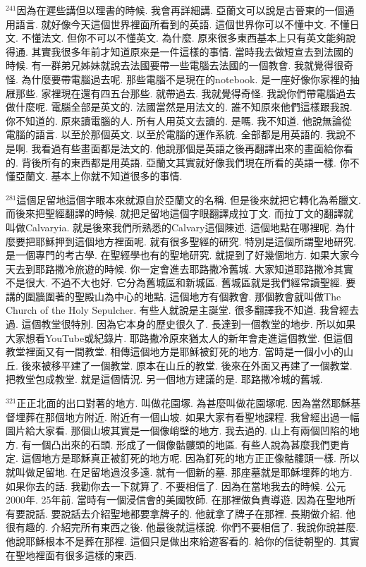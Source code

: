 \documentclass{book}
\begin{document}
$^{241}$因為在遲些講但以理書的時候.
我會再詳細講.
亞蘭文可以說是古晉東的一個通用語言.
就好像今天這個世界裡面所看到的英語.
這個世界你可以不懂中文.
不懂日文.
不懂法文.
但你不可以不懂英文.
為什麼.
原來很多東西基本上只有英文能夠說得通.
其實我很多年前才知道原來是一件這樣的事情.
當時我去做短宣去到法國的時候.
有一群弟兄姊妹就說去法國要帶一些電腦去法國的一個教會.
我就覺得很奇怪.
為什麼要帶電腦過去呢.
那些電腦不是現在的notebook.
是一座好像你家裡的抽屜那些.
家裡現在還有四五台那些.
就帶過去.
我就覺得奇怪.
我說你們帶電腦過去做什麼呢.
電腦全部是英文的.
法國當然是用法文的.
誰不知原來他們這樣跟我說.
你不知道的.
原來讀電腦的人.
所有人用英文去讀的.
是嗎.
我不知道.
他說無論從電腦的語言.
以至於那個英文.
以至於電腦的運作系統.
全部都是用英語的.
我說不是啊.
我看過有些畫面都是法文的.
他說那個是英語之後再翻譯出來的畫面給你看的.
背後所有的東西都是用英語.
亞蘭文其實就好像我們現在所看的英語一樣.
你不懂亞蘭文.
基本上你就不知道很多的事情.

$^{281}$這個足留地這個字眼本來就源自於亞蘭文的名稱.
但是後來就把它轉化為希臘文.
而後來把聖經翻譯的時候.
就把足留地這個字眼翻譯成拉丁文.
而拉丁文的翻譯就叫做Calvaryia.
就是後來我們所熟悉的Calvary這個陳述.
這個地點在哪裡呢.
為什麼要把耶穌押到這個地方裡面呢.
就有很多聖經的研究.
特別是這個所謂聖地研究.
是一個專門的考古學.
在聖經學也有的聖地研究.
就提到了好幾個地方.
如果大家今天去到耶路撒冷旅遊的時候.
你一定會進去耶路撒冷舊城.
大家知道耶路撒冷其實不是很大.
不過不大也好.
它分為舊城區和新城區.
舊城區就是我們經常讀聖經.
要講的圍牆圍著的聖殿山為中心的地點.
這個地方有個教會.
那個教會就叫做The Church of the Holy Sepulcher.
有些人就說是主誕堂.
很多翻譯我不知道.
我曾經去過.
這個教堂很特別.
因為它本身的歷史很久了.
長達到一個教堂的地步.
所以如果大家想看YouTube或紀錄片.
耶路撒冷原來猶太人的新年會走進這個教堂.
但這個教堂裡面又有一間教堂.
相傳這個地方是耶穌被釘死的地方.
當時是一個小小的山丘.
後來被移平建了一個教堂.
原本在山丘的教堂.
後來在外面又再建了一個教堂.
把教堂包成教堂.
就是這個情況.
另一個地方建議的是.
耶路撒冷城的舊城.

$^{321}$正正北面的出口對著的地方.
叫做花園塚.
為甚麼叫做花園塚呢.
因為當然耶穌基督埋葬在那個地方附近.
附近有一個山坡.
如果大家有看聖地課程.
我曾經出過一幅圖片給大家看.
那個山坡其實是一個像峭壁的地方.
我去過的.
山上有兩個凹陷的地方.
有一個凸出來的石頭.
形成了一個像骷髏頭的地區.
有些人說為甚麼我們更肯定.
這個地方是耶穌真正被釘死的地方呢.
因為釘死的地方正正像骷髏頭一樣.
所以就叫做足留地.
在足留地過沒多遠.
就有一個新的墓.
那座墓就是耶穌埋葬的地方.
如果你去的話.
我勸你去一下就算了.
不要相信了.
因為在當地我去的時候.
公元2000年.
25年前.
當時有一個浸信會的美國牧師.
在那裡做負責導遊.
因為在聖地所有要說話.
要說話去介紹聖地都要拿牌子的.
他就拿了牌子在那裡.
長期做介紹.
他很有趣的.
介紹完所有東西之後.
他最後就這樣說.
你們不要相信了.
我說你說甚麼.
他說耶穌根本不是葬在那裡.
這個只是做出來給遊客看的.
給你的信徒朝聖的.
其實在聖地裡面有很多這樣的東西.
\end{document}
